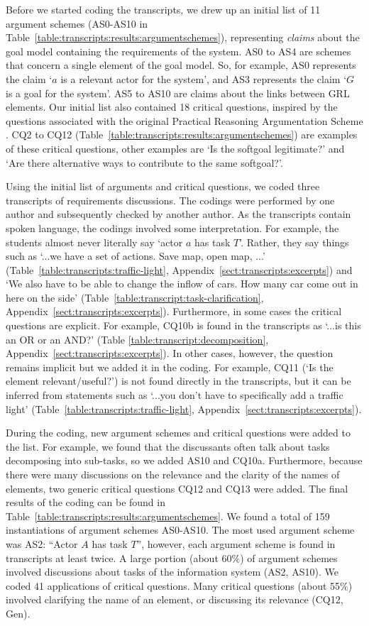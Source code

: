 Before we started coding the transcripts, we drew up an initial list of 11 argument schemes (AS0-AS10 in Table~\ref{table:transcripts:results:argumentschemes}), representing \emph{claims} about the goal model containing the requirements of the system. AS0 to AS4 are schemes that concern a single element of the goal model. So, for example, AS0 represents the claim `$a$ is a relevant actor for the system', and AS3 represents the claim `$G$ is a goal for the system'. AS5 to AS10 are claims about the links between GRL elements. Our initial list also contained 18 critical questions, inspired by the questions associated with the original Practical Reasoning Argumentation Scheme \cite{atkinson2007}. CQ2 to CQ12 (Table~\ref{table:transcripts:results:argumentschemes}) are examples of these critical questions, other examples are `Is the softgoal legitimate?' and `Are there alternative ways to contribute to the same softgoal?'.

Using the initial list of arguments and critical questions, we coded three transcripts of requirements discussions. The codings were performed by one author and subsequently checked by another author. As the transcripts contain spoken language, the codings involved some interpretation. For example, the students almost never literally say `actor $a$ has task $T$'. Rather, they say things such as `...we have a set of actions. Save map, open map, ...' (Table~\ref{table:transcripts:traffic-light}, Appendix~\ref{sect:transcripts:excerpts}) and `We also have to be able to change the inflow of cars. How many car come out in here on the side' (Table~\ref{table:transcript:task-clarification}, Appendix~\ref{sect:transcripts:excerpts}). Furthermore, in some cases the critical questions are explicit. For example, CQ10b is found in the transcripts as `...is this an OR or an AND?' (Table \ref{table:transcript:decomposition}, Appendix~\ref{sect:transcripts:excerpts}). In other cases, however, the question remains implicit but we added it in the coding. For example, CQ11 (`Is the element relevant/useful?') is not found directly in the transcripts, but it can be inferred from statements such as `...you don't have to specifically add a traffic light' (Table~\ref{table:transcripts:traffic-light}, Appendix~\ref{sect:transcripts:excerpts}). 

During the coding, new argument schemes and critical questions were added to the list. For example, we found that the discussants often talk about tasks decomposing into sub-tasks, so we added AS10 and CQ10a. Furthermore, because there were many discussions on the relevance and the clarity of the names of elements, two generic critical questions CQ12 and CQ13 were added. The final results of the coding can be found in Table~\ref{table:transcripts:results:argumentschemes}. We found a total of 159 instantiations of argument schemes AS0-AS10. The most used argument scheme was AS2: ``Actor $A$ has task $T$'', however, each argument scheme is found in transcripts at least twice. A large portion (about 60\%) of argument schemes involved discussions about tasks of the information system (AS2, AS10). We coded 41 applications of critical questions. Many critical questions (about 55\%) involved clarifying the name of an element, or discussing its relevance (CQ12, Gen).

